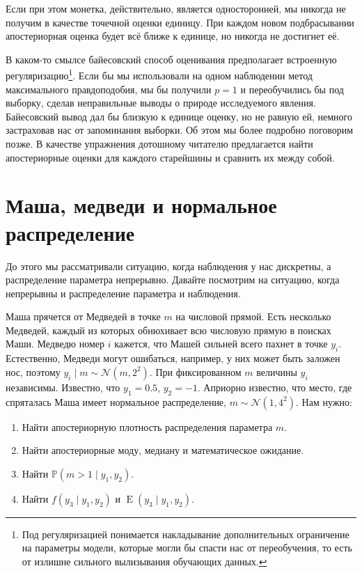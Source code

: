 \documentclass[12pt, a4paper, oneside]{extreport}
\DeclareMathOperator{\E}{\mathop{E}}
\def \mN{\mathcal{N}}
\def \mbb{\mathbb}
\def \PP{\mbb{P}}
\theoremstyle{plain}              %
\theoremstyle{definition}         %
\begin{document}
Если при этом монетка, действительно, является односторонней, мы никогда не получим в качестве точечной оценки единицу. При каждом новом подбрасывании апостериорная оценка будет всё ближе к единице, но никогда не достигнет её.  

В каком-то смылсе байесовский способ оценивания предполагает встроенную регуляризацию\footnote{Под регуляризацией понимается накладывание дополнительных ограничение на параметры модели, которые могли бы спасти нас от переобучения, то есть от излишне сильного вылизывания обучающих данных.}. Если бы мы использовали на одном наблюдении метод максимального правдоподобия, мы бы получили $p=1$ и переобучились бы под выборку, сделав неправильные выводы о природе исследуемого явления. Байесовский вывод дал бы близкую к единице оценку, но не равную ей, немного застраховав нас от запоминания выборки.  Об этом мы более подробно поговорим позже.  В качестве упражнения дотошному читателю предлагается найти апостериорные оценки для каждого старейшины и сравнить их между собой.

\section{Маша, медведи и нормальное распределение}

До этого мы рассматривали ситуацию, когда наблюдения у нас дискретны, а распределение параметра непрерывно. Давайте посмотрим на ситуацию, когда непрерывны и распределение параметра и наблюдения. 

Маша прячется от Медведей в точке $m$ на числовой прямой. Есть несколько Медведей, каждый из которых обнюхивает всю числовую прямую в поисках Маши. Медведю номер $i$ кажется, что Машей сильней всего пахнет в точке $y_i$. Естественно, Медведи могут ошибаться, например, у них может быть заложен нос, поэтому $y_i \mid m \sim \mN(m, 2^2)$. При фиксированном $m$ величины $y_i$ независимы. Известно, что $y_1 = 0.5$, $y_2 = −1$.  Априорно известно, что место, где спряталась Маша имеет нормальное распределение, $m \sim \mN(1, 4^2)$. Нам нужно:

\begin{enumerate}
\item Найти апостериорную плотность распределения параметра $m$.
\item Найти апостериорные моду, медиану и математическое ожидание.
\item Найти $\PP(m > 1 \mid y_1,y_2)$.
\item Найти $f(y_3 \mid y_1,y_2)$ и $\E(y_3 \mid y_1,y_2)$.
\end{enumerate}
\end{document}
